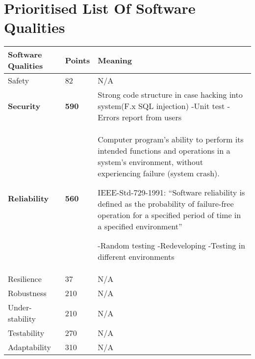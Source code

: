 \renewcommand{\headrulewidth}{0.1pt}
\renewcommand{\footrulewidth}{0.1pt}

\section*{Prioritised List Of Software Qualities}

\begin{center}
	\setlength{\tabcolsep}{3em}
	\begin{tabular}{| l | l | p{6cm} |}
	
 		\hline
			Software Qualities & Points & Meaning \\ \hline
   			Safety & 82 & N\slash A \\ \hline
			
			\textbf{Security} & \textbf{590} & Strong code structure in case hacking into system(F.x SQL injection)
			-Unit test
			-Errors report from users \\ \hline
			
			\textbf{Reliability} & \textbf{560} & Computer program’s ability  to perform its intended functions and operations in a system's environment, without experiencing failure (system crash).

			IEEE-Std-729-1991: “Software reliability is defined as the probability of failure-free operation for a specified period of time in a specified environment” 

			-Random testing
			-Redeveloping
			-Testing in different environments \\ \hline
			
			Resilience & 37 & N\slash A \\ \hline
			
			Robustness & 210 & N\slash A \\ \hline
			
			Under-stability & 210 & N\slash A \\ \hline
			
			Testability & 270 & N\slash A \\ \hline
			
			Adaptability & 310 &  N\slash A \\ \hline
			

\end{tabular}
\end{center}
